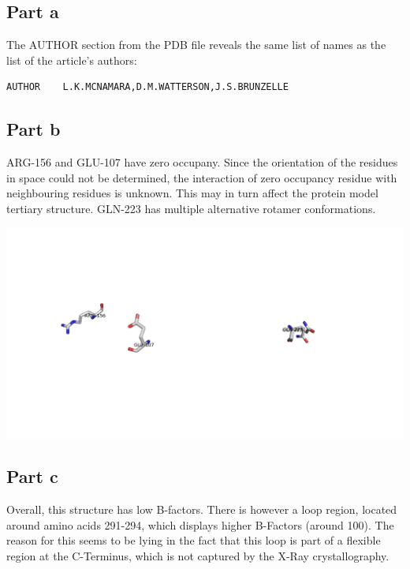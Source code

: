 \documentclass[11pt, a4paper,titlepage]{article}
\begin{document}
\subsection*{Part a}

The AUTHOR section from the PDB file reveals the same list of names as
the list of the article's authors:

\begin{verbatim}
AUTHOR    L.K.MCNAMARA,D.M.WATTERSON,J.S.BRUNZELLE
\end{verbatim}

\subsection*{Part b}

ARG-156 and GLU-107 have zero occupany. Since the orientation of the
residues in space could not be determined, the interaction of zero
occupancy residue with neighbouring residues is unknown. This may in
turn affect the protein model tertiary structure. GLN-223 has multiple
alternative rotamer conformations.

\includegraphics[width=15cm]{./Figures/5b.png}

\subsection*{Part c}

Overall, this structure has low B-factors. There is however a loop
region, located around amino acids 291-294, which displays higher
B-Factors (around 100). The reason for this seems to be lying in the
fact that this loop is part of a flexible region at the C-Terminus,
which is not captured by the X-Ray crystallography.
\end{document}

